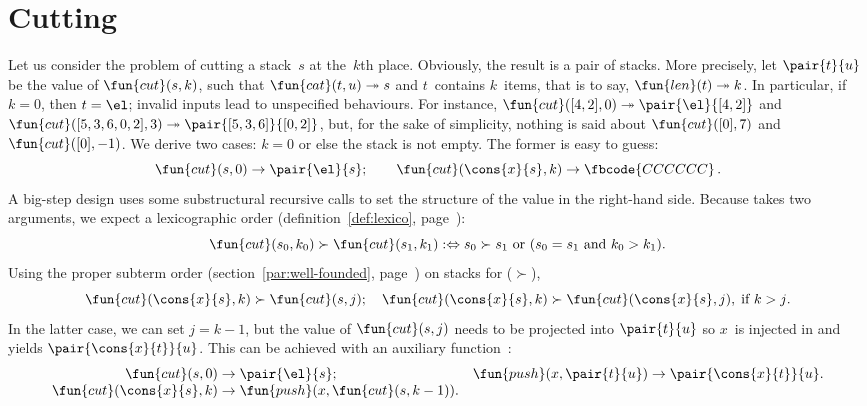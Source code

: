 \section{Cutting}
\label{sec:cutting}

 Let us consider the problem of cutting a
stack~\(s\) at the~\(k\)th place. Obviously, the result is a pair of
stacks. More precisely, let \(\pair{t}{u}\) be the value of
\(\fun{cut}(s,k)\), such that \(\fun{cat}(t,u) \twoheadrightarrow
s\) and \(t\)~contains \(k\)~items, that is to
say, \(\fun{len}(t) \twoheadrightarrow k\). In particular, if~\(k =
0\), then \(t = \el\); invalid inputs lead to unspecified
behaviours. For instance, \(\fun{cut}([4,2],0) \twoheadrightarrow
\pair{\el}{[4,2]}\) and \(\fun{cut}([5,3,6,0,2],3) \twoheadrightarrow
\pair{[5,3,6]}{[0,2]}\), but, for the sake of simplicity, nothing is
said about \(\fun{cut}([0],7)\) and \(\fun{cut}([0],-1)\). We derive
two cases: \(k = 0\) or else the stack is not empty. The former is
easy to guess:
\begin{equation*}
\fun{cut}(s,0)           \rightarrow \pair{\el}{s};\qquad
\fun{cut}(\cons{x}{s},k) \rightarrow \fbcode{CCCCCC}\,.
\end{equation*}
A big\hyp{}step design uses some
sub\-structural recursive calls to set the structure of the value in
the right\hyp{}hand side. Because  takes two arguments, we
expect a lexicographic order
(definition~\eqref{def:lexico}, page~\pageref{def:lexico}):
\begin{equation*}
\fun{cut}(s_0,k_0) \succ \fun{cut}(s_1,k_1)
:\Leftrightarrow
\text{\(s_0 \succ s_1\) or (\(s_0 = s_1\) and \(k_0 > k_1\))}.
\end{equation*}
Using the proper subterm order
(section~\ref{par:well-founded}, page~\pageref{par:well-founded}) on
stacks for (\(\succ\)),
\begin{equation*}
\fun{cut}(\cons{x}{s},k) \succ \fun{cut}(s,j);\quad
\fun{cut}(\cons{x}{s},k) \succ \fun{cut}(\cons{x}{s},j),\;
\text{if \(k > j\)}.
\end{equation*}
In the latter case, we can set \(j=k-1\), but the value of
\(\fun{cut}(s,j)\) needs to be projected into \(\pair{t}{u}\) so
\(x\)~is injected in and yields \(\pair{\cons{x}{t}}{u}\). This can be
achieved with an auxiliary
function~:
\begin{equation*}
\begin{array}{@{}r@{\;}l@{\;}lr@{\;}l@{\;}l@{}}
\fun{cut}(s,0) & \rightarrow & \pair{\el}{s};
& \fun{push}(x,\pair{t}{u}) & \rightarrow & \pair{\cons{x}{t}}{u}.\\
\fun{cut}(\cons{x}{s},k) & \rightarrow
& \fun{push}(x,\fun{cut}(s,k-1)).
\end{array}
\end{equation*}


